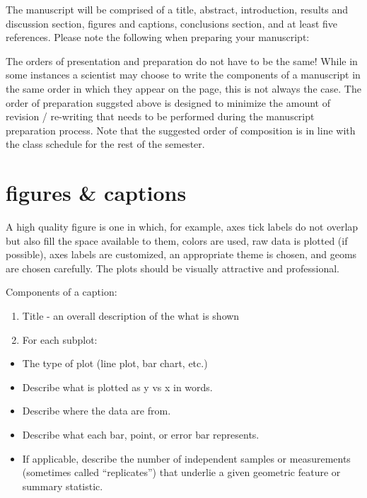 \documentclass[
]{krantz}
\providecommand{\tightlist}{%
  \setlength{\itemsep}{0pt}\setlength{\parskip}{0pt}}
\begin{document}
The manuscript will be comprised of a title, abstract, introduction, results and discussion section, figures and captions, conclusions section, and at least five references. Please note the following when preparing your manuscript:

The orders of presentation and preparation do not have to be the same! While in some instances a scientist may choose to write the components of a manuscript in the same order in which they appear on the page, this is not always the case. The order of preparation suggsted above is designed to minimize the amount of revision / re-writing that needs to be performed during the manuscript preparation process. Note that the suggested order of composition is in line with the class schedule for the rest of the semester.

\hypertarget{figures-captions}{%
\section{figures \& captions}\label{figures-captions}}

A high quality figure is one in which, for example, axes tick labels do not overlap but also fill the space available to them, colors are used, raw data is plotted (if possible), axes labels are customized, an appropriate theme is chosen, and geoms are chosen carefully. The plots should be visually attractive and professional.

Components of a caption:

\begin{enumerate}
\def\labelenumi{\arabic{enumi}.}
\tightlist
\item
  Title - an overall description of the what is shown
\item
  For each subplot:
\end{enumerate}

\begin{itemize}
\tightlist
\item
  The type of plot (line plot, bar chart, etc.)
\item
  Describe what is plotted as y vs x in words.
\item
  Describe where the data are from.
\item
  Describe what each bar, point, or error bar represents.
\item
  If applicable, describe the number of independent samples or measurements (sometimes called ``replicates'') that underlie a given geometric feature or summary statistic.
\end{itemize}
\end{document}
